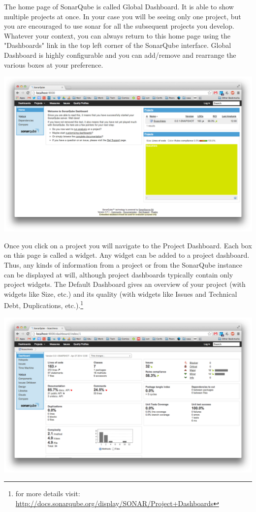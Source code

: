 \documentclass{article}
\begin{document}
The home page of SonarQube is called Global Dashboard. It is able to
show multiple projects at once. In your case you will be seeing only
one project, but you are encouraged to use sonar for all the
subsequent projects you develop. Whatever your context, you can
always return to this home page using the "Dashboards" link in the top
left corner of the SonarQube interface. Global Dashboard is highly
configurable and you can add/remove and rearrange the various boxes at
your preference. 
\begin{center}
\includegraphics[scale=0.3]{figures/ss1.png}
\end{center}


Once you click on a project you will navigate to the Project Dashboard. 
Each box on this page is called a widget. Any widget can be added to a
project dashboard. Thus, any kinds of information from a project or
from the SonarQube instance can be displayed at will, although project
dashboards typically contain only project widgets.
The Default Dashboard gives an overview of your project (with widgets
like Size, etc.) and its quality (with widgets like Issues and
Technical Debt, Duplications, etc.).\footnote{for more details visit: \url{http://docs.sonarqube.org/display/SONAR/Project+Dashboards}}
\begin{center}
\includegraphics[scale=0.3]{figures/ss2.png}
\end{center}
\end{document}

